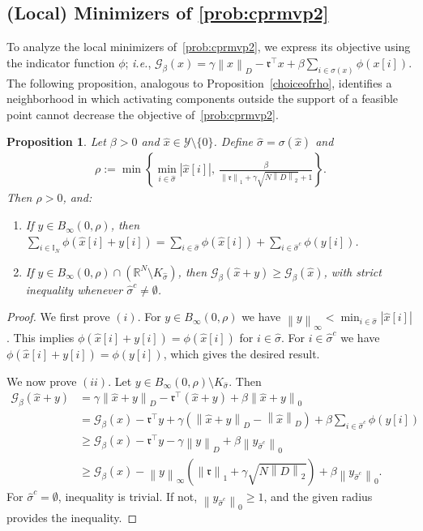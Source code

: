 \documentclass[11pt]{article}
\theoremstyle{plain}
\newtheorem{proposition}{Proposition}
\theoremstyle{definition}
\theoremstyle{plain}
\newcommand{\RR}{{\mathbb R}} %
\newcommand{\II}{{\mathbb I}}
\newcommand{\norm}[1]{\left\lVert#1\right\rVert}
\newcommand{\abs}[1]{\left\lvert#1\right\rvert}
\newcommand{\tpose}[1]{#1^{\top}}
\newcommand{\cG}{{\mathcal G}}
\newcommand{\ccr}{{\mathfrak r}}
\newcommand{\cY}{{\mathcal Y}}
\begin{document}
\subsection{(Local) Minimizers of \texorpdfstring{\eqref{prob:cprmvp2}}{P2}}
To analyze the local minimizers of~\eqref{prob:cprmvp2}, we express its
objective using the indicator function $\phi$; \textit{i.e.}, $\cG_\beta(x)=\gamma\norm{x}_D-\tpose{\ccr}x+\beta\sum_{i\in\sigma(x)}\phi(x[i])$. The following proposition, analogous to Proposition~\ref{choiceofrho}, identifies a neighborhood in which activating components outside the support
of a feasible point cannot decrease the objective of~\eqref{prob:cprmvp2}.
\begin{proposition}\label{choiceofrho2}
Let $\beta>0$ and $\hat{x}\in\cY\setminus\{0\}$. Define $\hat{\sigma}=\sigma(\hat{x})$ and
\begin{align*}
\rho:=\min\left\{\min_{i\in\hat{\sigma}}|\hat{x}[i]|,\ \frac{\beta}{\norm{\ccr}_1+\gamma\sqrt{N\norm{D}_2}+1}\right\}.
\end{align*}
Then $\rho>0$, and:
\begin{enumerate}[label=(\roman*)]
\item If $y\in B_\infty(0,\rho)$, then
$\sum_{i\in\II_N}\phi(\hat{x}[i]+y[i])=\sum_{i\in\hat{\sigma}}\phi(\hat{x}[i])+\sum_{i\in\hat{\sigma}^c}\phi(y[i])$.
\item If $y\in B_\infty(0,\rho)\cap(\RR^N\setminus K_{\hat{\sigma}})$, then $
\cG_\beta(\hat{x}+y)\geq \cG_\beta(\hat{x})$, with strict inequality whenever $\hat{\sigma}^c\neq\emptyset$.
\end{enumerate}
\end{proposition}
\begin{proof}
    We first prove $(i)$.  For $y\in B_\infty(0,\rho)$ we have $\norm{y}_\infty<\min_{i\in\hat{\sigma}}\abs{\hat{x}[i]}$. This implies $ \phi(\hat{x}[i]+y[i])=\phi(\hat{x}[i])$ for $i\in \hat{\sigma}$. For $i\in \hat{\sigma}^c$ we have $\phi(\hat{x}[i]+y[i])=\phi(y[i])$, which  gives the desired result.

        We now prove $(ii)$. Let $ y\in B_\infty(0,\rho)\setminus K_{\hat{\sigma}} $. Then
			\begin{align*}
				\cG_\beta(\hat{x}+y)&=\gamma\norm{\hat{x}+y}_D-\tpose{\ccr}(\hat{x}+y)+\beta\norm{\hat{x}+y}_0\\&
				=\cG_\beta(\hat{x})-\tpose{\ccr}y+\gamma(\norm{\hat{x}+y}_D-\norm{\hat{x}}_D)+\beta\sum_{i\in\hat{\sigma}^c}\phi(y[i])\\&
				\geq \cG_\beta(\hat{x})-\tpose{\ccr}y-\gamma\norm{y}_D+\beta\norm{y_{\hat{\sigma}^c}}_0\\&
				\geq\cG_\beta(\hat{x})-\norm{y}_\infty(\norm{\ccr}_1+\gamma\sqrt{N\norm{D}_2})+\beta\norm{y_{\hat{\sigma}^c}}_0.
			\end{align*}
					For $ \hat{\sigma}^c=\emptyset $, inequality is trivial. If not, $ \norm{y_{\hat{\sigma}^c}}_0\geq 1 $, and the given radius   provides the inequality.
\end{proof}
\end{document}
